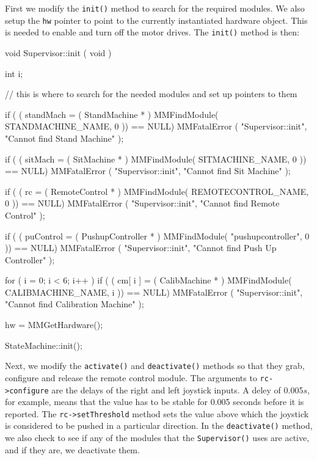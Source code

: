 \noindent First we modify the {\tt init()} method to search for the required modules. We
also setup the {\tt hw} pointer to point to the currently instantiated hardware
object. This is needed to enable and turn off the motor drives. The {\tt init()}
method is then:

\begin{codesegment}
void Supervisor::init ( void ) {

  int i;

  // this is where to search for the needed modules and set up pointers to them

  if ( ( standMach = ( StandMachine * ) 
         MMFindModule( STANDMACHINE_NAME, 0 )) == NULL)
     MMFatalError ( "Supervisor::init", "Cannot find Stand Machine" );
  
  if ( ( sitMach = ( SitMachine * ) 
         MMFindModule( SITMACHINE_NAME, 0 )) == NULL)
     MMFatalError ( "Supervisor::init", "Cannot find Sit Machine" );
  
  if ( ( rc = ( RemoteControl * ) 
         MMFindModule( REMOTECONTROL_NAME, 0 )) == NULL)
     MMFatalError ( "Supervisor::init", "Cannot find Remote Control" );

  if ( ( puControl = ( PushupController * ) 
         MMFindModule( "pushupcontroller", 0 )) == NULL)
     MMFatalError ( "Supervisor::init", "Cannot find Push Up Controller" );

  for ( i = 0; i < 6; i++ )
    if ( ( cm[ i ] = ( CalibMachine * ) 
           MMFindModule( CALIBMACHINE_NAME, i )) == NULL)
      MMFatalError ( "Supervisor::init", "Cannot find Calibration Machine" );

  hw = MMGetHardware();

  StateMachine::init();

}
\end{codesegment}

\noindent Next, we modify the {\tt activate()} and {\tt deactivate()} methods so
that they grab, configure and release the remote control module. The arguments
to {\tt rc->configure} are the delays of the right and left joystick inputs. A
deley of 0.005$s$, for example, means that the value has to be stable for 0.005
seconds before it is reported. The {\tt rc->setThreshold} method sets the value
above which the joystick is considered to be pushed in a particular
direction. In the {\tt deactivate()} method, we also check to see if any of the
modules that the {\tt Supervisor()} uses are active, and if they are, we
deactivate them.

